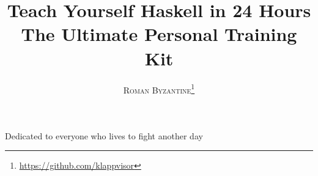 \begin{center}
\title{\Huge \textbf{Teach Yourself Haskell \newline in 24 Hours} \\ \huge The Ultimate Personal Training Kit}
\author{\textsc{Roman Byzantine}\thanks{\url{https://github.com/klappvisor}}}
\frontmatter
\maketitle
	
\begin{dedication}
	Dedicated to everyone who lives to fight another day
\end{dedication}

\end{center}

\newpage
